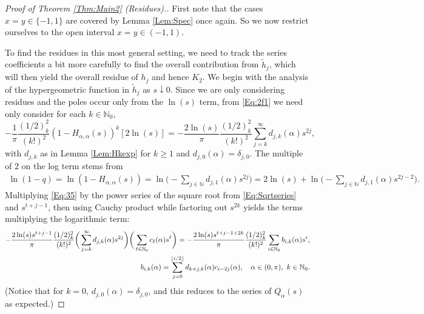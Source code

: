 \documentclass[letterpaper,10pt]{amsart}
\numberwithin{equation}{section}
\begin{document}
\begin{proof}[Proof of Theorem \ref{Thm:Main2} (Residues).]
First note that the cases $x=y\in\{-1,1\}$ are covered by Lemma \ref{Lem:Spec} once again. So we now restrict ourselves to the open interval $x=y\in(-1,1)$.

To find the residues in this most general setting, we need to track the series coefficients a bit more carefully to find the overall contribution from $\widetilde{h}_j$, which will then yield the overall residue of $h_j$ and hence $K_2$.
We begin with the analysis of the hypergeometric function in $\widetilde{h}_j$ as $s\downarrow0$.
Since we are only considering residues and the poles occur only from the $\ln(s)$ term, from \eqref{Eq:2f1} we need only consider for each $k\in\mathbb{N}_0$,
\begin{equation}\label{Eq:35}
-\frac{1}{\pi} \frac{(1/2)_k^2}{(k!)^2}(1-H_{\alpha,\alpha}(s))^k[2\ln(s)]=-\frac{2\ln(s)}{\pi} \frac{(1/2)_k^2}{(k!)^2}\sum_{j=k}^\infty d_{j,k}(\alpha) s^{2j},
\end{equation}
with $d_{j,k}$ as in Lemma \ref{Lem:Hkexp} for $k\geq 1$ and $d_{j,0}(\alpha)=\delta_{j,0}$. The multiple of $2$ on the log term stems from
\begin{align}
    \ln(1-q)=\ln(1-H_{\alpha,\alpha}(s))=\ln\Big(-\sum_{j\in\mathbb{N}} d_{j,1}(\alpha)s^{2j}\Big) =2\ln(s)+\ln\Big(-\sum_{j\in\mathbb{N}} d_{j,1}(\alpha)s^{2j-2}\Big).
\end{align}
Multiplying \eqref{Eq:35} by the power series of the square root from \eqref{Eq:Sqrtseries}
and $s^{t+j-1}$, then using Cauchy product while factoring out $s^{2k}$ yields the terms multiplying the logarithmic term:
\begin{align}\label{Eq:2F1Series2}
-\frac{2\ln(s)s^{t+j-1}}{\pi} \frac{(1/2)_k^2}{(k!)^2}\bigg(\sum_{j=k}^\infty d_{j,k}(\alpha) s^{2j}\bigg)\bigg(\sum_{\ell\in\mathbb{N}_0}c_\ell(\alpha)s^\ell\bigg)=-\frac{2\ln(s)s^{t+j-1+2k}}{\pi} \frac{(1/2)_k^2}{(k!)^2}\sum_{i\in\mathbb{N}_0} b_{i,k}(\alpha) s^{i},&\notag \\
b_{i,k}(\alpha)=\sum_{j=0}^{\lfloor i/2\rfloor} d_{k+j,k}(\alpha)c_{i-2j}(\alpha),\quad \alpha\in(0,\pi),\ k\in\mathbb{N}_0.&
\end{align}
(Notice that for $k=0$, $d_{j,0}(\alpha)=\delta_{j,0}$, and this reduces to the series of $Q_\alpha(s)$ as expected.)


\end{proof}
\end{document}
